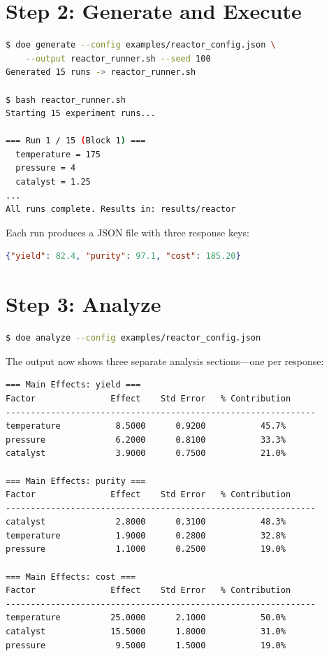 \documentclass[11pt]{book}
\begin{document}
\section{Step 2: Generate and Execute}

\begin{lstlisting}[language=bash]
$ doe generate --config examples/reactor_config.json \
    --output reactor_runner.sh --seed 100
Generated 15 runs -> reactor_runner.sh

$ bash reactor_runner.sh
Starting 15 experiment runs...

=== Run 1 / 15 (Block 1) ===
  temperature = 175
  pressure = 4
  catalyst = 1.25
...
All runs complete. Results in: results/reactor
\end{lstlisting}

Each run produces a JSON file with three response keys:

\begin{lstlisting}[language=json]
{"yield": 82.4, "purity": 97.1, "cost": 185.20}
\end{lstlisting}

\section{Step 3: Analyze}

\begin{lstlisting}[language=bash]
$ doe analyze --config examples/reactor_config.json
\end{lstlisting}

The output now shows three separate analysis sections---one per response:

\begin{lstlisting}[language=bash]
=== Main Effects: yield ===
Factor               Effect    Std Error   % Contribution
--------------------------------------------------------------
temperature           8.5000      0.9200           45.7%
pressure              6.2000      0.8100           33.3%
catalyst              3.9000      0.7500           21.0%

=== Main Effects: purity ===
Factor               Effect    Std Error   % Contribution
--------------------------------------------------------------
catalyst              2.8000      0.3100           48.3%
temperature           1.9000      0.2800           32.8%
pressure              1.1000      0.2500           19.0%

=== Main Effects: cost ===
Factor               Effect    Std Error   % Contribution
--------------------------------------------------------------
temperature          25.0000      2.1000           50.0%
catalyst             15.5000      1.8000           31.0%
pressure              9.5000      1.5000           19.0%
\end{lstlisting}
\end{document}
